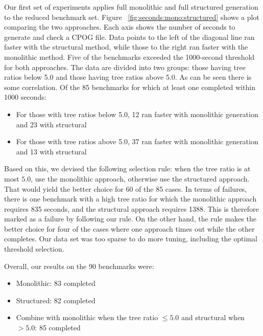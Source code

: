 \documentclass[twoside,11pt]{article}
\begin{document}
Our first set of experiments applies full monolithic and full
structured generation to the reduced benchmark set.  Figure
~\ref{fig:seconds:mono:structured} shows a plot comparing the two
approaches.  Each axis shows the number of seconds to generate and
check a CPOG file.  Data points to the left of the diagonal line ran
faster with the structural method, while those to the right ran faster
with the monolithic method.  Five of the benchmarks exceeded the 1000-second threshold for both approaches.
The data are divided into two groups:
those having tree ratios below 5.0 and those having tree ratios above
5.0.  
As can be seen there is some correlation.  Of the 85 benchmarks for which at least one completed within 1000 seconds:
\begin{itemize}
\item For those with tree ratios below 5.0, 12 ran faster with monolithic generation and 23 with structural
\item For those with tree ratios above 5.0, 37 ran faster with monolithic generation and 13 with structural
\end{itemize}
Based on this, we devised the following selection rule: when the
tree ratio is at most $5.0$, use the monolithic approach, otherwise
use the structured approach.  That would yield the better choice for
60 of the 85 cases.  In terms of failures, there is one benchmark with
a high tree ratio for which the monolithic approach requires 835
seconds, and the structural approach requires 1388. This is therefore
marked as a failure by following our rule.  On the other hand, the rule makes the better choice for four of the cases where one approach times out while the other completes.
Our data set was too sparse to do more tuning, including the optimal threshold selection.

Overall, our results on the 90 benchmarks were:
\begin{itemize}
\item Monolithic: 83 completed
\item Structured: 82 completed
\item Combine with monolithic when the tree ratio $\leq 5.0$ and structural when $> 5.0$: 85 completed
\end{itemize}
\end{document}

